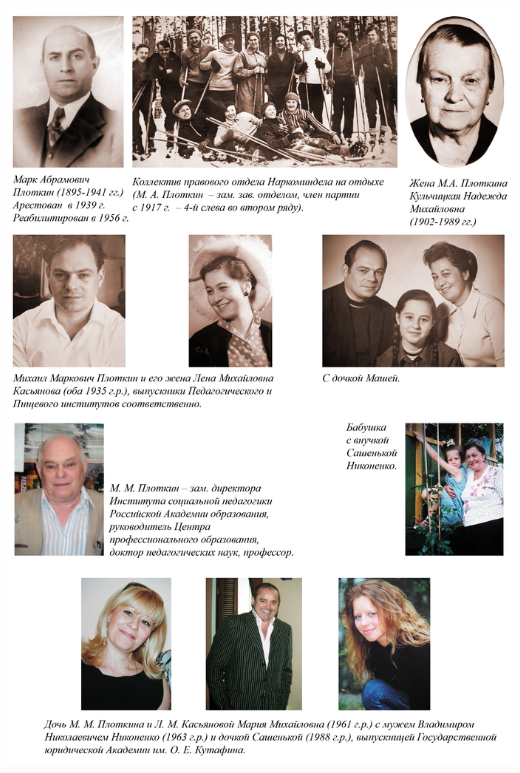\begin{center}
\noindent
\includegraphics[height=\paperheight]{inc/plotkiny}

\end{center}

\restoregeometry
